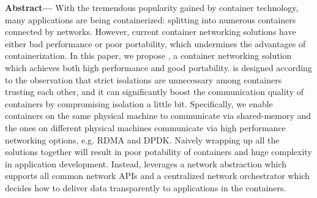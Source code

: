 \textbf{Abstract---} 
With the tremendous popularity gained by container technology, many applications are being containerized:
splitting into numerous containers connected by networks. However, current container networking solutions
have either bad performance or poor portability, which undermines the advantages of containerization.
In this paper, we propose \sysname, a container networking solution which achieves both high performance
and good portability. \sysname is designed according to the observation that strict isolations are unnecessary 
among containers trusting each other, and it can significantly boost the communication quality of containers by 
compromising isolation a little bit. Specifically, we enable containers on the same physical machine
to communicate via shared-memory and the ones on different physical machines communicate via
high performance networking options, e.g. RDMA and DPDK. Naively wrapping up all the solutions
together will result in poor potability of containers and huge complexity in application development.
Instead, \sysname leverages a network abstraction which supports all common network APIs and 
a centralized network orchestrator which decides how to deliver data transparently to applications in the containers.
